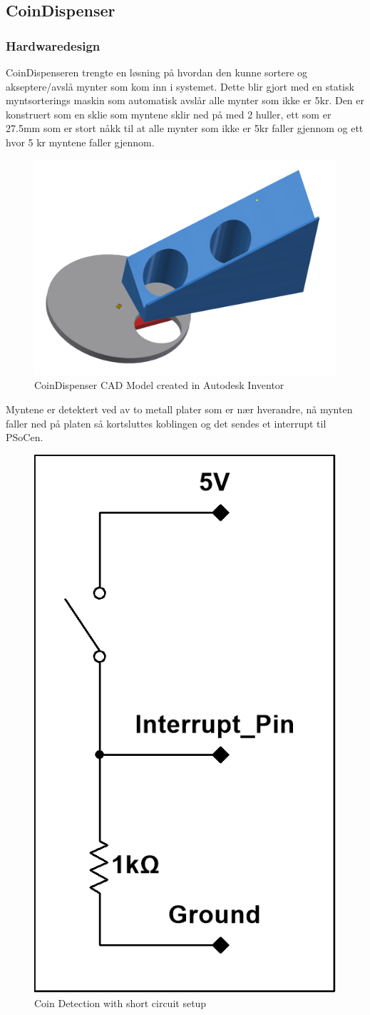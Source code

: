 \documentclass[Rapport/Rapport_main.tex]{subfiles}
\begin{document}
\subsection{CoinDispenser}
\subsubsection{Hardwaredesign}
CoinDispenseren trengte en løsning på hvordan den kunne sortere og akseptere/avslå mynter som kom inn i systemet. Dette blir gjort med en statisk myntsorterings maskin som automatisk avslår alle mynter som ikke er 5kr. Den er konstruert som en sklie som myntene sklir ned på med 2 huller, ett som er 27.5mm som er stort nåkk til at alle mynter som ikke er 5kr faller gjennom og ett hvor 5 kr myntene faller gjennom.

\begin{figure}[H]
    \centering
    \includegraphics[width=\linewidth]{Rapport/BallDispenser/CoinDispenser/graphics/coinmaster.png}
    \caption{CoinDispenser CAD Model created in Autodesk Inventor}
    \label{fig:CoinCAD}
\end{figure}

Myntene er detektert ved av to metall plater som er nær hverandre, nå mynten faller ned på platen så kortsluttes koblingen og det sendes et interrupt til PSoCen.

\begin{figure}[H]
    \centering
    \includegraphics[width=0.3\linewidth]{Rapport/BallDispenser/CoinDispenser/graphics/CoinDispInterrupt.png}
    \caption{Coin Detection with short circuit setup}
    \label{fig:coin_disable_interrupt_diagram}
\end{figure}
\end{document}
